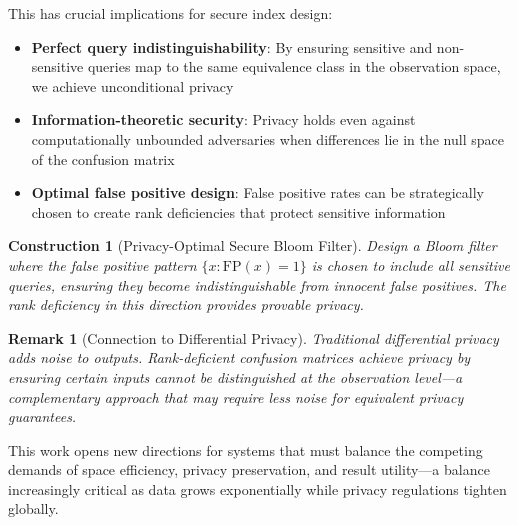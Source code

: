 \documentclass[11pt,final]{article}
\newtheorem{remark}[theorem]{Remark}
\newtheorem{construction}[theorem]{Construction}
\begin{document}
This has crucial implications for secure index design:

\begin{itemize}
    \item \textbf{Perfect query indistinguishability}: By ensuring sensitive and non-sensitive queries map to the same equivalence class in the observation space, we achieve unconditional privacy
    \item \textbf{Information-theoretic security}: Privacy holds even against computationally unbounded adversaries when differences lie in the null space of the confusion matrix
    \item \textbf{Optimal false positive design}: False positive rates can be strategically chosen to create rank deficiencies that protect sensitive information
\end{itemize}

\begin{construction}[Privacy-Optimal Secure Bloom Filter]
Design a Bloom filter where the false positive pattern $\{x : \text{FP}(x) = 1\}$ is chosen to include all sensitive queries, ensuring they become indistinguishable from innocent false positives. The rank deficiency in this direction provides provable privacy.
\end{construction}

\begin{remark}[Connection to Differential Privacy]
Traditional differential privacy adds noise to outputs. Rank-deficient confusion matrices achieve privacy by ensuring certain inputs cannot be distinguished at the observation level—a complementary approach that may require less noise for equivalent privacy guarantees.
\end{remark}

This work opens new directions for systems that must balance the competing demands of space efficiency, privacy preservation, and result utility—a balance increasingly critical as data grows exponentially while privacy regulations tighten globally.


\end{document}
